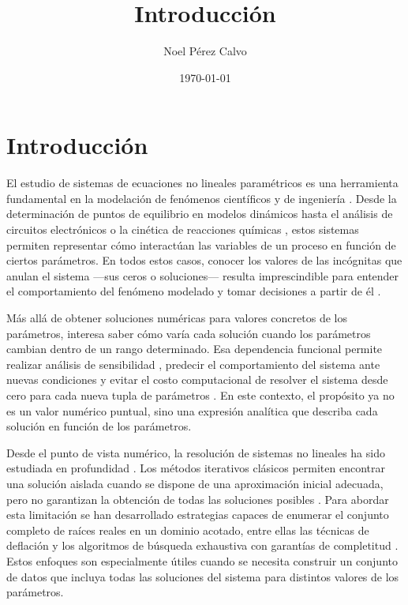 \documentclass{article} \usepackage[utf8]{inputenc} \usepackage[spanish]{babel} \usepackage{amsmath, amssymb, amsthm} \usepackage{bm} \usepackage{float} \usepackage{longtable} \usepackage[hidelinks]{hyperref}
\title{Introducción} \author{Noel Pérez Calvo} \date{\today}
\begin{document}
\maketitle

\section*{Introducción} \label{sec:introduccion} El estudio de sistemas de ecuaciones no lineales paramétricos es una herramienta fundamental en la modelación de fenómenos científicos y de ingeniería \cite{gershenfeld2012nature}.  Desde la determinación de puntos de equilibrio en modelos dinámicos \cite{strogatz2018nonlinear} hasta el análisis de circuitos electrónicos \cite{horowitz2015art} o la cinética de reacciones químicas \cite{laidler1987chemical}, estos sistemas permiten representar cómo interactúan las variables de un proceso en función de ciertos parámetros.  En todos estos casos, conocer los valores de las incógnitas que anulan el sistema —sus ceros o soluciones— resulta imprescindible para entender el comportamiento del fenómeno modelado y tomar decisiones a partir de él \cite{allgower1990numerical}.

Más allá de obtener soluciones numéricas para valores concretos de los parámetros, interesa saber cómo varía cada solución cuando los parámetros cambian dentro de un rango determinado.  Esa dependencia funcional permite realizar análisis de sensibilidad \cite{saltelli2008global}, predecir el comportamiento del sistema ante nuevas condiciones \cite{forrester2008engineering} y evitar el costo computacional de resolver el sistema desde cero para cada nueva tupla de parámetros \cite{eldred2009formulations}.  En este contexto, el propósito ya no es un valor numérico puntual, sino una expresión analítica que describa cada solución en función de los parámetros.

Desde el punto de vista numérico, la resolución de sistemas no lineales ha sido estudiada en profundidad \cite{burden2010numerical}.  Los métodos iterativos clásicos \cite{nocedal2006numerical} permiten encontrar una solución aislada cuando se dispone de una aproximación inicial adecuada, pero no garantizan la obtención de todas las soluciones posibles \cite{meleshko1991nonlinear}.  Para abordar esta limitación se han desarrollado estrategias capaces de enumerar el conjunto completo de raíces reales en un dominio acotado, entre ellas las técnicas de deflación \cite{ojika1983deflation} y los algoritmos de búsqueda exhaustiva con garantías de completitud \cite{bartnik2024mdcm}.  Estos enfoques son especialmente útiles cuando se necesita construir un conjunto de datos que incluya todas las soluciones del sistema para distintos valores de los parámetros.
\end{document}
